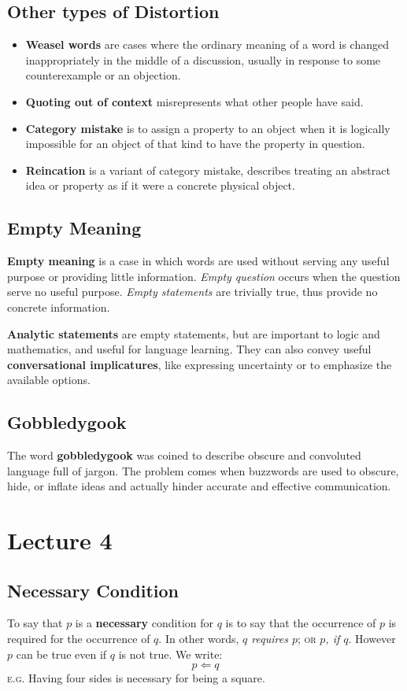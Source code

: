 \documentclass{article}
\begin{document}
\subsection{Other types of Distortion}
\begin{itemize}
  \item \textbf{Weasel words} are cases where the ordinary meaning of a word is changed inappropriately in the middle of a discussion, usually in response to some counterexample or an objection.
  \item \textbf{Quoting out of context} misrepresents what other people have said.
  \item \textbf{Category mistake} is to assign a property to an object when it is logically impossible for an object of that kind to have the property in question.
  \item \textbf{Reincation} is a variant of category mistake, describes treating an abstract idea or property as if it were a concrete physical object.
\end{itemize}

\subsection{Empty Meaning}
\textbf{Empty meaning} is a case in which words are used without serving any useful purpose or providing little information. \emph{Empty question} occurs when the question serve no useful purpose. \emph{Empty statements} are trivially true, thus provide no concrete information.

\textbf{Analytic statements} are empty statements, but are important to logic and mathematics, and useful for language learning. They can also convey useful \textbf{conversational implicatures}, like expressing uncertainty or to emphasize the available options.

\subsection{Gobbledygook}
The word \textbf{gobbledygook} was coined to describe obscure and convoluted language full of jargon. The problem comes when buzzwords are used to obscure, hide, or inflate ideas and actually hinder accurate and effective communication.

\section{Lecture 4}

\subsection{Necessary Condition}
To say that $p$ is a \textbf{necessary} condition for $q$ is to say that the occurrence of $p$ is required for the occurrence of $q$. In other words, \emph{$q$ requires $p$}; \textsc{or} \emph{$p$, if $q$}. However $p$ can be true even if $q$ is not true. We write:
$$ p \Leftarrow q $$
\textsc{e.g.} Having four sides is necessary for being a square.
\end{document}
